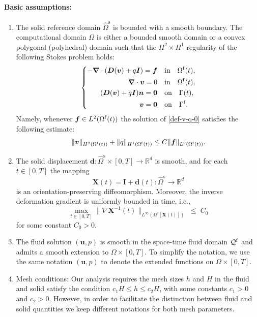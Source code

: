 \documentclass[11pt,reqno]{amsart}
\theoremstyle{definition}
\theoremstyle{plain}
\numberwithin{theorem}{section}
\numberwithin{proposition}{section}
\numberwithin{lemma}{section}
\numberwithin{equation}{section}
\newcommand{\bs}[1]{\boldsymbol{#1}}
\newcommand{\uu}[1]  {{\bs{#1}} }
\newcommand{\grad}   { \uu{\nabla}    }
\newcommand{\bv}{{\bs v}}
\newcommand{\bu}{\uu{u}}
\def\R{{\mathbb{R}}}
\renewcommand{\(}{\bigl(}
\renewcommand{\)}{\bigr)}
\begin{document}
\paragraph{\bf Basic assumptions:}
\begin{enumerate}
  \item[(C1)] The solid reference domain $\widehat{\Omega}^{\mathrm{s}}$ is bounded with a smooth boundary. The computational domain $\Omega$ is either a bounded smooth domain or a convex polygonal (polyhedral) domain such that the $H^2\times H^1$ regularity of the following Stokes problem holds:
  \begin{align}\label{def-v-q-0}
  \left\{
  \begin{aligned}
  -\grad\cdot({\bs D}(\bv) + q{\bs I}) = {\bs f} &\quad \mbox{in}\quad \Omega^{\rm f}(t), \\
  \grad\cdot{\bs v}=0 &\quad\mbox{in}\quad \Omega^{\rm f}(t), \\
  ({\bs D}(\bv) + q{\bs I}){\bs n} = \bs 0 &\quad\mbox{on}\quad \Gamma(t), \\
  {\bs v}= \bs 0 &\quad \mbox{on}\quad \Gamma^{\rm f} .
  \end{aligned}
  \right.
  \end{align}
  Namely, whenever ${\bs f} \in L^2(\Omega^{\rm f}(t))$ the solution of \eqref{def-v-q-0} satisfies the following estimate: 
  \begin{align}\label{H2-H1-estimate-Stokes}
  \|{\bs v}\|_{H^2(\Omega^{\rm f}(t))} + \|q\|_{H^1(\Omega^{\rm f}(t))}
  \leq C\|{\bs f}\|_{L^2(\Omega^{\rm f}(t))} . 
  \end{align}
  

  \item[(C2)] The solid displacement ${\bs d}:
  \widehat{\Omega}^{\mathrm{s}}\times[0,T]\rightarrow\R^d$ is smooth, and for each $t\in[0,T]$ the mapping
  \[
  \boldsymbol{X}(t) = {\bs I} + {\bs d}(t) : \widehat{\Omega}^{\mathrm{s}}\to \mathbb{R}^d
  \]
  is an orientation-preserving diffeomorphism. Moreover, the inverse deformation gradient is uniformly bounded in time, i.e., 
  \[
  \max_{t\in[0,T]} \|\nabla \boldsymbol{X}^{-1}(t)\|_{L^{\infty}(\Omega^{\mathrm{s}}[\boldsymbol{X}(t)])}
  \;\le\; C_0
  \]
  for some constant $C_0>0$.

  \item[(C3)] The fluid solution $(\boldsymbol{u},p)$ is smooth in the space-time fluid domain  $\mathcal Q^{\rm f}$
  and admits a smooth extension to $\Omega\times[0,T]$. To simplify the notation, we use the same notation $(\bu,p)$ to denote the extended functions  on $\Omega\times[0,T]$.


  \item[(C4)] Mesh conditions: Our analysis requires the mesh sizes $h$ and $H$ in the fluid and solid  satisfy the condition {$c_1 H\le h\le c_2H$}, with some constants $c_1>0$ and $c_2>0$. However, in order to facilitate the distinction between fluid and solid quantities we keep different notations for both mesh parameters.   
\end{enumerate} 
\end{document}
